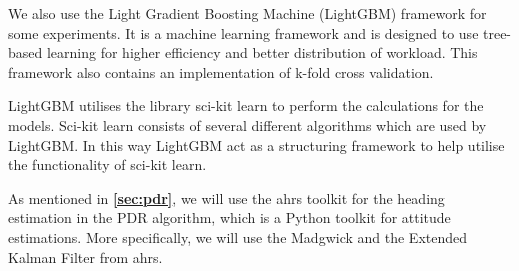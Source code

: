We also use the Light Gradient Boosting Machine (LightGBM)  framework for some experiments. It is a machine learning framework and is designed to use tree-based learning for higher efficiency and better distribution of workload. This framework also contains an implementation of k-fold cross validation.\cite{LightGBM}

LightGBM utilises the library sci-kit learn to perform the calculations for the models. Sci-kit learn consists of several different algorithms which are used by LightGBM. In this way LightGBM act as a structuring framework to help utilise the functionality of sci-kit learn. \cite{scikit}

As mentioned in \textbf{\autoref{sec:pdr}}, we will use the \gls{ahrs} toolkit for the heading estimation in the PDR algorithm, which is a Python toolkit for attitude estimations. More specifically, we will use the Madgwick and the Extended Kalman Filter from \gls{ahrs}.\cite{ahrs}




